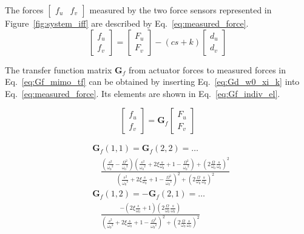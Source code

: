 \documentclass[10pt]{iopart}
\begin{document}
\par
The forces \(\begin{bmatrix}f_u & f_v\end{bmatrix}\) measured by the two force sensors represented in Figure~\ref{fig:system_iff} are described by Eq.~\eqref{eq:measured_force}.
\begin{equation}
\label{eq:measured_force}
  \begin{bmatrix} f_{u} \\ f_{v} \end{bmatrix} =
  \begin{bmatrix} F_u \\ F_v \end{bmatrix} - (c s + k)
  \begin{bmatrix} d_u \\ d_v \end{bmatrix}
\end{equation}

The transfer function matrix \(\mathbf{G}_{f}\) from actuator forces to measured forces in Eq.~\eqref{eq:Gf_mimo_tf} can be obtained by inserting Eq.~\eqref{eq:Gd_w0_xi_k} into Eq.~\eqref{eq:measured_force}.
Its elements are shown in Eq.~\eqref{eq:Gf_indiv_el}.

\begin{equation}
\label{eq:Gf_mimo_tf}
  \begin{bmatrix} f_{u} \\ f_{v} \end{bmatrix} = \mathbf{G}_{f} \begin{bmatrix} F_u \\ F_v \end{bmatrix}
\end{equation}

\begin{subequations}
\label{eq:Gf_indiv_el}
\label{eq:Gf}
  \begin{align}
    & \mathbf{G}_{f}(1,1) = \mathbf{G}_{f}(2,2) = \dots \nonumber \\
    & \quad {\scriptstyle \frac{\left( \frac{s^2}{{\omega_0}^2} - \frac{\Omega^2}{{\omega_0}^2} \right) \left( \frac{s^2}{{\omega_0}^2} + 2 \xi \frac{s}{\omega_0} + 1 - \frac{{\Omega}^2}{{\omega_0}^2} \right) + \left( 2 \frac{\Omega}{\omega_0} \frac{s}{\omega_0} \right)^2}{\left( \frac{s^2}{{\omega_0}^2} + 2 \xi \frac{s}{\omega_0} + 1 - \frac{{\Omega}^2}{{\omega_0}^2} \right)^2 + \left( 2 \frac{\Omega}{\omega_0} \frac{s}{\omega_0} \right)^2} } \label{eq:Gf_diag_tf} \\
    & \mathbf{G}_{f}(1,2) = -\mathbf{G}_{f}(2,1) = \dots \nonumber \\
    & \quad {\scriptstyle \frac{- \left( 2 \xi \frac{s}{\omega_0} + 1 \right) \left( 2 \frac{\Omega}{\omega_0} \frac{s}{\omega_0} \right)}{\left( \frac{s^2}{{\omega_0}^2} + 2 \xi \frac{s}{\omega_0} + 1 - \frac{{\Omega}^2}{{\omega_0}^2} \right)^2 + \left( 2 \frac{\Omega}{\omega_0} \frac{s}{\omega_0} \right)^2} } \label{eq:Gf_off_diag_tf}
  \end{align}
\end{subequations}
\end{document}
